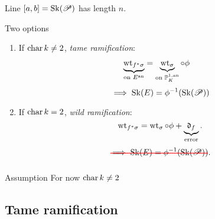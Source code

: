 \begin{frame}
	\pause
Line $[a, b] = \operatorname{Sk}(\mathscr P)$ has length  $n$. 
\end{frame}
\begin{frame}{Two options}
	\begin{minipage}[t]{.48\textwidth}
		\begin{enumerate}
		\item If $\operatorname{char} k \ne 2$, \emph{tame ramification}: \begin{align*}
				\underbrace{\operatorname{wt}_{f^*\sigma}}_{\text{on }E{}^{\text{an}}} &= \underbrace{\operatorname{wt}_{\sigma}}_{\text{on }\mathbb P^{1, \text{an}}_K} \mathbin{\circ} \phi
			\end{align*}
			\pause
			\[
				\implies \operatorname{Sk}(E) = \phi^{-1}(\operatorname{Sk}(\mathscr P))
			\]
	\end{enumerate}
	\pause

	\end{minipage}
	\;
	\begin{minipage}[t]{.48\textwidth}
	\begin{enumerate}
		\setcounter{enumi}{1}
		\item If $\operatorname{char} k = 2$, \emph{wild ramification}:
			\[
				\operatorname{wt}_{f^* \sigma} = \operatorname{wt}_{\sigma} \circ \phi + \underbrace{\mathfrak{d} _f}_{\text{error}}
			.\] 
			\pause
			\[
				\redoutb{\text{$\implies \sk(E) = \phi^{-1}(\sk(\sP))$}}
			.\] 
	\end{enumerate}
	\end{minipage}
	\pause
	\medskip
	\begin{block}{Assumption}
		For now $\operatorname{char} k \ne 2$
	\end{block}

\end{frame}

\subsection{Tame ramification} \label{sec:tame_ramification}


